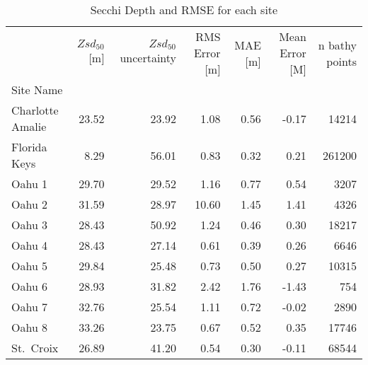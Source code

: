\begin{table}
\centering
\caption{Secchi Depth and RMSE for each site}
\label{tab:ocean_color_summary_by_site}
\begin{tabular}{lrrrrrr}
\toprule
{} &  $Zsd_{50}$[m] &  $Zsd_{50}$ uncertainty &  RMS Error [m] &  MAE [m] &  Mean Error [M] &  n bathy points \\
Site Name        &                &                         &                &          &                 &                 \\
\midrule
Charlotte Amalie &          23.52 &                   23.92 &           1.08 &     0.56 &           -0.17 &           14214 \\
Florida Keys     &           8.29 &                   56.01 &           0.83 &     0.32 &            0.21 &          261200 \\
Oahu 1           &          29.70 &                   29.52 &           1.16 &     0.77 &            0.54 &            3207 \\
Oahu 2           &          31.59 &                   28.97 &          10.60 &     1.45 &            1.41 &            4326 \\
Oahu 3           &          28.43 &                   50.92 &           1.24 &     0.46 &            0.30 &           18217 \\
Oahu 4           &          28.43 &                   27.14 &           0.61 &     0.39 &            0.26 &            6646 \\
Oahu 5           &          29.84 &                   25.48 &           0.73 &     0.50 &            0.27 &           10315 \\
Oahu 6           &          28.93 &                   31.82 &           2.42 &     1.76 &           -1.43 &             754 \\
Oahu 7           &          32.76 &                   25.54 &           1.11 &     0.72 &           -0.02 &            2890 \\
Oahu 8           &          33.26 &                   23.75 &           0.67 &     0.52 &            0.35 &           17746 \\
St.~Croix        &          26.89 &                   41.20 &           0.54 &     0.30 &           -0.11 &           68544 \\
\bottomrule
\end{tabular}
\end{table}
